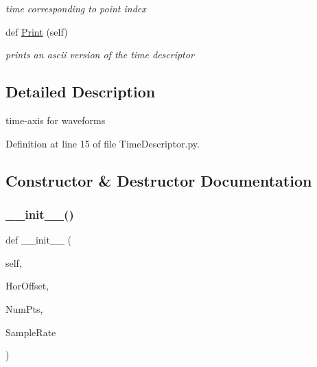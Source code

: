 \begin{DoxyCompactItemize}
\begin{DoxyCompactList}\small\item\em time corresponding to point index \end{DoxyCompactList}\item 
\mbox{\label{classSignalIntegrity_1_1TimeDomain_1_1Waveform_1_1TimeDescriptor_1_1TimeDescriptor_a0203fc9c617eec80ba28741251ee3b86}} 
def \hyperlink{classSignalIntegrity_1_1TimeDomain_1_1Waveform_1_1TimeDescriptor_1_1TimeDescriptor_a0203fc9c617eec80ba28741251ee3b86}{Print} (self)
\begin{DoxyCompactList}\small\item\em prints an ascii version of the time descriptor \end{DoxyCompactList}\end{DoxyCompactItemize}


\subsection{Detailed Description}
time-\/axis for waveforms 

Definition at line 15 of file Time\+Descriptor.\+py.



\subsection{Constructor \& Destructor Documentation}
\mbox{\label{classSignalIntegrity_1_1TimeDomain_1_1Waveform_1_1TimeDescriptor_1_1TimeDescriptor_a82ea8eeea7b21f9766fa212014721486}} 
\subsubsection{\texorpdfstring{\+\_\+\+\_\+init\+\_\+\+\_\+()}{\_\_init\_\_()}}
{\footnotesize\ttfamily def \+\_\+\+\_\+init\+\_\+\+\_\+ (\begin{DoxyParamCaption}\item[{}]{self,  }\item[{}]{Hor\+Offset,  }\item[{}]{Num\+Pts,  }\item[{}]{Sample\+Rate }\end{DoxyParamCaption})}



